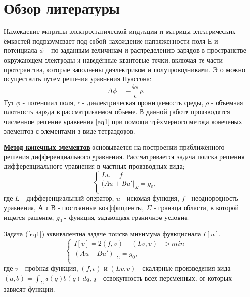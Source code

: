 \documentclass[a4paper,12pt]{report} %
\begin{document}
\chapter*{Обзор литературы}

Нахождение матрицы электростатической индукции и матрицы электрических ёмкостей подразумевает под собой нахождение напряженности поля $Е$ и потенциала $\phi$ – по заданным величинам и распределению зарядов в пространстве окружающем электроды и наведённые квантовые точки, включая те части протсранства, которые заполнены диэлектриком и полупроводниками. Это можно осуществить путем решения уравнения Пуассона:
\begin{equation}\label{eq1}
    \Delta \phi = -\frac{4\pi}{\epsilon}\rho.
\end{equation}
Тут $\phi$ - потенциал поля, $\epsilon$ - диэлектрическая проницаемость среды, $\rho$ - объемная плотность заряда  в рассматриваемом объеме. В данной работе производится численное решение уравнения \ref{eq1} при помощи трёхмерного метода конеченых элементов с элементами в виде тетраэдоров.

\textbf{\underline{Метод конечных элементов}} основывается на построении приближённого решения дифференциального уравнения.
Рассматривается задача поиска решения дифференциального уравнения в частных производных вида;
\begin{equation}\label{eq2}
    \begin{cases}
    Lu = f
    \\
    (Au + Bu'|_{\Sigma} = g_0,
    \\
    \end{cases}
\end{equation}
 где $L$ - дифференциальный оператор, 
$u$ - искомая функция,
$f$ - неоднородность уравнения,
$А$ и $В$ - постоянные коэффициенты,
$\Sigma$ - граница области, в которой ищется решение,
$g_0$ - функция, задающаяя граничное условие.

Задача (\ref{eq1}) эквивалентна задаче поиска минимума функционала $I[u]$:
\begin{equation}\label{eq2}
    \begin{cases}
    I[v] = 2(f, v) - (Lv, v) -> min 
    \\
    (Au + Bu')|_{\Sigma} = g_0,
    \\
    \end{cases}
\end{equation}
 где $v$ - пробная функция, $(f, v)$ и $(Lv, v)$ - скалярные произведения вида $(a, b) = \int_{\Sigma} a(q)b(q) \, dq $, $q$ - совокупность всех переменных, от которых зависят функции.
\end{document}
